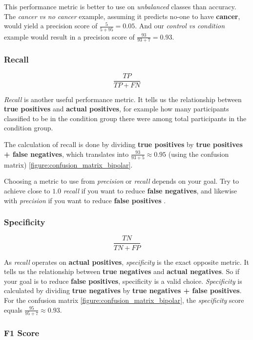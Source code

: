 This performance metric is better to use on \textit{unbalanced} classes than accuracy. The \textit{cancer vs no cancer} example, assuming it predicts no-one to have \textbf{cancer}, would yield a precision score of $ \frac{5}{5+95} = 0.05 $. And our \textit{control vs condition} example would result in a precision score of $ \frac{93}{93+7} = 0.93 $.

\subsubsection{Recall}

\[ \frac{TP}{TP+FN} \]

\textit{Recall} is another useful performance metric. It tells us the relationship between \textbf{true positives} and \textbf{actual positives}, for example how many participants classified to be in the condition group there were among total participants in the condition group.

The calculation of recall is done by dividing \textbf{true positives} by \textbf{true positives + false negatives}, which translates into $ \frac{93}{93+5} \approx 0.95 $ (using the confusion matrix) \ref{figure:confusion_matrix_bipolar}.

Choosing a metric to use from \textit{precision} or \textit{recall} depends on your goal. Try to achieve close to $ 1.0 $ \textit{recall} if you want to reduce \textbf{false negatives}, and likewise with \textit{precision} if you want to reduce \textbf{false positives} \cite{ml_metrics}.

\subsubsection{Specificity}

\[ \frac{TN}{TN+FP} \]

As \textit{recall} operates on \textbf{actual positives}, \textit{specificity} is the exact opposite metric. It tells us the relationship between \textbf{true negatives} and \textbf{actual negatives}. So if your goal is to reduce \textbf{false positives}, specificity is a valid choice. \textit{Specificity} is calculated by dividing \textbf{true negatives} by \textbf{true negatives + false positives}. For the confusion matrix \ref{figure:confusion_matrix_bipolar}, the \textit{specificity} score equals $ \frac{95}{95+7} \approx 0.93 $.

\subsubsection{F1 Score}

